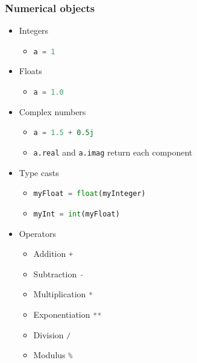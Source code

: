 \documentclass[xcolor=table,10pt,final]{beamer}
\begin{document}
\begin{frame}[fragile]
  \frametitle{Numerical objects}
  \begin{itemize}
    \item Integers
      \begin{itemize}
        \item \lstinline[language=python]|a = 1|
      \end{itemize}
    \item Floats
      \begin{itemize}
        \item \lstinline[language=python]|a = 1.0|
      \end{itemize}
    \item Complex numbers
      \begin{itemize}
        \item \lstinline[language=python]|a = 1.5 + 0.5j|
        \item \lstinline[language=python]|a.real| and \lstinline[language=python]|a.imag| return each component
      \end{itemize}
    \item Type casts
      \begin{itemize}
        \item \lstinline[language=python]|myFloat = float(myInteger)|
        \item \lstinline[language=python]|myInt = int(myFloat)|
      \end{itemize}
    \item Operators
      \begin{itemize}
        \item Addition \lstinline[language=python]|+|
        \item Subtraction \lstinline[language=python]|-|
        \item Multiplication \lstinline[language=python]|*|
        \item Exponentiation \lstinline[language=python]|**|
        \item Division \lstinline[language=python]|/|
        \item Modulus \lstinline[language=python]|%|
      \end{itemize}
  \end{itemize}
\end{frame}
\end{document}
